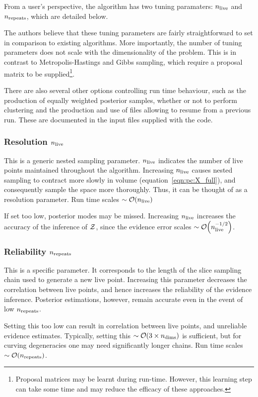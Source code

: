 From a user's perspective, the \PolyChord{} algorithm has two tuning paramaters: $n_{\mathrm{live}}$ and $n_{\mathrm{repeats}}$, which are detailed below.

The authors believe that these tuning parameters are fairly straightforward to set in comparison to existing algorithms. More importantly, the number of tuning parameters does not scale with the dimensionality of the problem. This is in contrast to Metropolis-Hastings and Gibbs sampling, which require a proposal matrix to be supplied\footnote{Proposal matrices may be learnt during run-time. However, this learning step can take some time and may reduce the efficacy of these approaches.}.

There are also several other options controlling run time behaviour, such as the production of equally weighted posterior samples, whether or not to perform clustering and the production and use of files allowing \PolyChord{} to resume from a previous run. These are documented in the input files supplied with the code.

\subsubsection*{Resolution $n_{\mathrm{live}}$ }
This is a generic nested sampling parameter. $n_{\mathrm{live}}$ indicates the number of live points maintained throughout the algorithm. Increasing $n_{\mathrm{live}}$ causes nested sampling to contract more slowly in volume (equation~\ref{eqn:pc:X_full}), and consequently sample the space more thoroughly. Thus, it can be thought of as a resolution parameter. Run time scales ${\sim\mathcal{O}{\left(n_{\mathrm{live}}\right)}}$

If set too low, posterior modes may be missed. Increasing $n_{\mathrm{live}}$ increases the accuracy of the inference of $\mathcal{Z}$, since the evidence error scales ${\sim\mathcal{O}{\left(n_{\mathrm{live}}^{-1/2}\right)}}$. 

\subsubsection*{Reliability $n_{\mathrm{repeats}}$}
This is a \PolyChord{} specific parameter. It corresponds to the length of the slice sampling chain used to generate a new live point. Increasing this parameter decreases the correlation between live points, and hence increases the reliability of the evidence inference. Posterior estimations, however, remain accurate even in the event of low $n_{\mathrm{repeats}}$.

Setting this too low can result in correlation between live points, and unreliable evidence estimates. Typically, setting this ${\sim\mathcal{O}{\left(3\times n_{\mathrm{dims}}\right)}}$ is sufficient, but for curving degeneracies one may need significantly longer chains. Run time scales ${\sim\mathcal{O}{\left(n_{\mathrm{repeats}}\right)}}$. 


